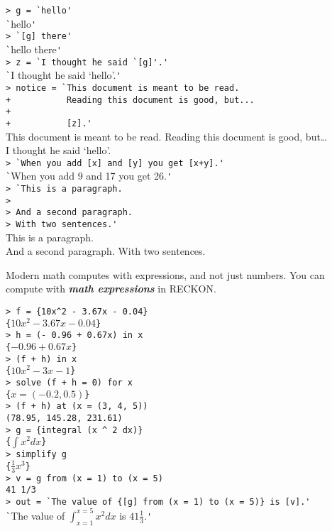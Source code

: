 \documentclass[12pt]{article}
\newcommand{\skey}[2]{{\bf \em #1#2}\index{#1}}
\newenvironment{indpar}[1][0.3in]%
	{\begin{list}{}%
		     {\setlength{\itemsep}{0in}%
		      \setlength{\topsep}{0in}%
		      \setlength{\parsep}{1ex}%
		      \setlength{\labelwidth}{#1}%
		      \setlength{\leftmargin}{#1}%
		      \addtolength{\leftmargin}{\labelsep}}%
	 \item}%
	{\end{list}}
\begin{document}
\begin{indpar}
\verb|> g = `hello'| \\
\verb|`|hello\verb|'| \\
\verb|> `[g] there'| \\
\verb|`|hello there\verb|'| \\
\verb|> z = `I thought he said `[g]'.'| \\
\verb|`|I thought he said `hello'.\verb|'| \\
\verb/> notice = `This document is meant to be read./ \\
\verb/+           Reading this document is good, but.../ \\
\verb/+           / \\
\verb/+           [z].'/ \\
This document is meant to be read.  Reading this document is good, but\ldots
\\[2ex]
I thought he said `hello'. \\
\verb|> `When you add [x] and [y] you get [x+y].'| \\
\verb|`|When you add 9 and 17 you get 26.\verb|'| \\
\verb|> `This is a paragraph.| \\
\verb|> | \\
\verb|> And a second paragraph.| \\
\verb|> With two sentences.'| \\
This is a paragraph. \\[2ex]
And a second paragraph. With two sentences.
\end{indpar}

Modern math computes with expressions, and not just numbers.
You can compute with \skey{math expression}s in RECKON.

\begin{indpar}
\verb|> f = {10x^2 - 3.67x - 0.04}| \\
\verb|{|$10x^2-3.67x-0.04$\verb|}| \\
\verb|> h = (- 0.96 + 0.67x) in x| \\
\verb|{|$-0.96+0.67x$\verb|}| \\
\verb|> (f + h) in x| \\
\verb|{|$10x^2-3x-1$\verb|}| \\
\verb|> solve (f + h = 0) for x| \\
\verb|{|$x = (-0.2, 0.5)$\verb|}| \\
\verb|> (f + h) at (x = (3, 4, 5))| \\
\verb|(78.95, 145.28, 231.61)| \\
\verb|> g = {integral (x ^ 2 dx)}| \\
\verb|{|$\int x^2 dx$\verb|}| \\
\verb|> simplify g| \\
\verb|{|$\frac{1}{3} x^3$\verb|}| \\
\verb|> v = g from (x = 1) to (x = 5)| \\
\verb|41 1/3| \\
\verb|> out = `The value of {[g] from (x = 1) to (x = 5)} is [v].'| \\
\verb|`|The value of $\int_{x = 1}^{x = 5} x^2 dx$ is $41\frac{1}{3}$.\verb|'|
\end{indpar}
\end{document}
